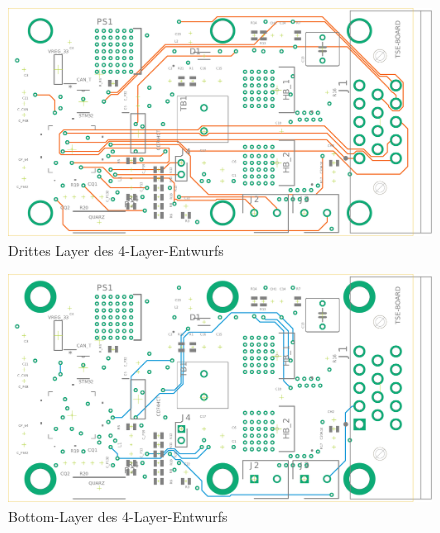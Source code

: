 \begin{figure}[H]%
\centering
\includegraphics[angle=-90,width=0.7\columnwidth]{./Bilder/15route4layer}%
\caption{Drittes Layer des 4-Layer-Entwurfs}%
\label{}%
\end{figure}\newpage
\begin{figure}[H]%
\centering
\includegraphics[angle=-90,width=0.7\columnwidth]{./Bilder/bot4layer}%
\caption{Bottom-Layer des 4-Layer-Entwurfs}%
\label{}%
\end{figure}\newpage

